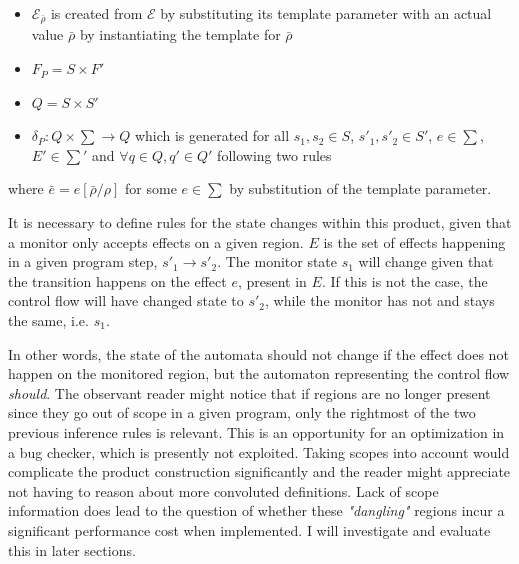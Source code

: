 \begin{itemize}
    \item $\mathcal{E}_{\bar{\rho}}$ is created from $\mathcal{E}$ by substituting its template parameter with an actual value $\bar{\rho}$ by instantiating the template for $\bar{\rho}$
    \item $F_P = S \times F'$
    \item $Q = S \times S'$
    \item $\delta_P : Q \times \sum \rightarrow Q$ which is generated for all $s_1, s_2 \in S$, $s'_1, s'_2 \in S'$, $e \in \sum$, $E' \in \sum'$ and $\forall q \in Q , q' \in Q'$ following two rules
\end{itemize}
    
\begin{center}
    \begin{prooftree}
    \end{prooftree}
    \hspace{2cm}
    \begin{prooftree}
    \end{prooftree}
\end{center}

\noindent where $\bar{e} = e [\bar{\rho}/\rho]$ for some $e \in \sum$ by substitution of the template parameter. 
    
\newpar It is necessary to define rules for the state changes within this product, given that a monitor only accepts effects on a given region. $E$ is the set of effects happening in a given program step, $s'_1 \rightarrow s'_2$. The monitor state $s_1$ will change given that the transition happens on the effect $e$, present in $E$. If this is not the case, the control flow will have changed state to $s'_2$, while the monitor has not and stays the same, i.e. $s_1$. 

\newpar In other words, the state of the automata should not change if the effect does not happen on the monitored region, but the automaton representing the control flow \textit{should}. The observant reader might notice that if regions are no longer present since they go out of scope in a given program, only the rightmost of the two previous inference rules is relevant. This is an opportunity for an optimization in a bug checker, which is presently not exploited. Taking scopes into account would complicate the product construction significantly and the reader might appreciate not having to reason about more convoluted definitions. Lack of scope information does lead to the question of whether these \textit{"dangling"} regions incur a significant performance cost when implemented. I will investigate and evaluate this in later sections.

